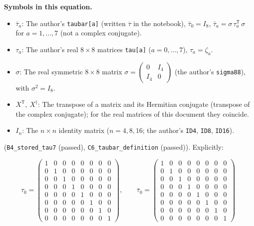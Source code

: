 \documentclass[
  10pt,
]{article}
\providecommand{\tightlist}{%
  \setlength{\itemsep}{0pt}\setlength{\parskip}{0pt}}
\begin{document}
\textbf{Symbols in this equation.}

\begin{itemize}
\tightlist
\item
  \(\bar\tau_a\): The author's \texttt{taubar{[}a{]}} (written
  \(\overline{\tau}\) in the notebook), \(\bar\tau_0 = I_8\),
  \(\bar\tau_a = \sigma\,\tau_a^{\mathsf T}\,\sigma\) for
  \(a = 1, \dots, 7\) (not a complex conjugate).
\item
  \(\tau_a\): The author's real \(8 \times 8\) matrices
  \texttt{tau{[}a{]}} (\(a = 0, \dots, 7\)), \(\tau_a = \zeta_a\).
\item
  \(\sigma\): The real symmetric \(8 \times 8\) matrix
  \(\sigma = \begin{pmatrix} 0 & I_4 \\ I_4 & 0 \end{pmatrix}\) (the
  author's \texttt{sigma88}), with \(\sigma^2 = I_8\).
\item
  \(X^{\mathsf T},\ X^\dagger\): The transpose of a matrix and its
  Hermitian conjugate (transpose of the complex conjugate); for the real
  matrices of this document they coincide.
\item
  \(I_n\): The \(n \times n\) identity matrix (\(n = 4, 8, 16\); the
  author's \texttt{ID4}, \texttt{ID8}, \texttt{ID16}).
\end{itemize}

(\texttt{B4\_stored\_tau7} (passed), \texttt{C6\_taubar\_definition}
(passed)). Explicitly:

\[
\tau_0 = \begin{pmatrix} 1 & 0 & 0 & 0 & 0 & 0 & 0 & 0 \\ 0 & 1 & 0 & 0 & 0 & 0 & 0 & 0 \\ 0 & 0 & 1 & 0 & 0 & 0 & 0 & 0 \\ 0 & 0 & 0 & 1 & 0 & 0 & 0 & 0 \\ 0 & 0 & 0 & 0 & 1 & 0 & 0 & 0 \\ 0 & 0 & 0 & 0 & 0 & 1 & 0 & 0 \\ 0 & 0 & 0 & 0 & 0 & 0 & 1 & 0 \\ 0 & 0 & 0 & 0 & 0 & 0 & 0 & 1 \end{pmatrix},\qquad \bar\tau_0 = \begin{pmatrix} 1 & 0 & 0 & 0 & 0 & 0 & 0 & 0 \\ 0 & 1 & 0 & 0 & 0 & 0 & 0 & 0 \\ 0 & 0 & 1 & 0 & 0 & 0 & 0 & 0 \\ 0 & 0 & 0 & 1 & 0 & 0 & 0 & 0 \\ 0 & 0 & 0 & 0 & 1 & 0 & 0 & 0 \\ 0 & 0 & 0 & 0 & 0 & 1 & 0 & 0 \\ 0 & 0 & 0 & 0 & 0 & 0 & 1 & 0 \\ 0 & 0 & 0 & 0 & 0 & 0 & 0 & 1 \end{pmatrix}
\]
\end{document}
